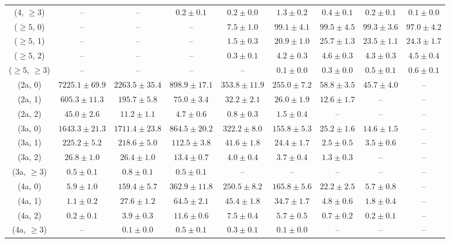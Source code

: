 \begin{table}[h!]
{\begin{tabular}{ccccccccc}
	(4, $\ge3$) & -- & -- & $0.2\pm 0.1$ & $0.2\pm 0.0$ & $1.3\pm 0.2$ & $0.4\pm 0.1$ & $0.2\pm 0.1$ & $0.1\pm 0.0$ \\[0.5ex] 
	($\ge5$, 0) & -- & -- & -- & $7.5\pm 1.0$ & $99.1\pm 4.1$ & $99.5\pm 4.5$ & $99.3\pm 3.6$ & $97.0\pm 4.2$ \\[0.5ex] 
	($\ge5$, 1) & -- & -- & -- & $1.5\pm 0.3$ & $20.9\pm 1.0$ & $25.7\pm 1.3$ & $23.5\pm 1.1$ & $24.3\pm 1.7$ \\[0.5ex] 
	($\ge5$, 2) & -- & -- & -- & $0.3\pm 0.1$ & $4.2\pm 0.3$ & $4.6\pm 0.3$ & $4.3\pm 0.3$ & $4.5\pm 0.4$ \\[0.5ex] 
	($\ge5$, $\ge3$) & -- & -- & -- & -- & $0.1\pm 0.0$ & $0.3\pm 0.0$ & $0.5\pm 0.1$ & $0.6\pm 0.1$ \\[0.5ex] 
	(2a, 0) & $7225.1\pm 69.9$ & $2263.5\pm 35.4$ & $898.9\pm 17.1$ & $353.8\pm 11.9$ & $255.0\pm 7.2$ & $58.8\pm 3.5$ & $45.7\pm 4.0$ & -- \\[0.5ex] 
	(2a, 1) & $605.3\pm 11.3$ & $195.7\pm 5.8$ & $75.0\pm 3.4$ & $32.2\pm 2.1$ & $26.0\pm 1.9$ & $12.6\pm 1.7$ & -- & -- \\[0.5ex] 
	(2a, 2) & $45.0\pm 2.6$ & $11.2\pm 1.1$ & $4.7\pm 0.6$ & $0.8\pm 0.3$ & $1.5\pm 0.4$ & -- & -- & -- \\[0.5ex] 
	(3a, 0) & $1643.3\pm 21.3$ & $1711.4\pm 23.8$ & $864.5\pm 20.2$ & $322.2\pm 8.0$ & $155.8\pm 5.3$ & $25.2\pm 1.6$ & $14.6\pm 1.5$ & -- \\[0.5ex] 
	(3a, 1) & $225.2\pm 5.2$ & $218.6\pm 5.0$ & $112.5\pm 3.8$ & $41.6\pm 1.8$ & $24.4\pm 1.7$ & $2.5\pm 0.5$ & $3.5\pm 0.6$ & -- \\[0.5ex] 
	(3a, 2) & $26.8\pm 1.0$ & $26.4\pm 1.0$ & $13.4\pm 0.7$ & $4.0\pm 0.4$ & $3.7\pm 0.4$ & $1.3\pm 0.3$ & -- & -- \\[0.5ex] 
	(3a, $\ge3$) & $0.5\pm 0.1$ & $0.8\pm 0.1$ & $0.5\pm 0.1$ & -- & -- & -- & -- & -- \\[0.5ex] 
	(4a, 0) & $5.9\pm 1.0$ & $159.4\pm 5.7$ & $362.9\pm 11.8$ & $250.5\pm 8.2$ & $165.8\pm 5.6$ & $22.2\pm 2.5$ & $5.7\pm 0.8$ & -- \\[0.5ex] 
	(4a, 1) & $1.1\pm 0.2$ & $27.6\pm 1.2$ & $64.5\pm 2.1$ & $45.4\pm 1.8$ & $34.7\pm 1.7$ & $4.8\pm 0.6$ & $1.8\pm 0.4$ & -- \\[0.5ex] 
	(4a, 2) & $0.2\pm 0.1$ & $3.9\pm 0.3$ & $11.6\pm 0.6$ & $7.5\pm 0.4$ & $5.7\pm 0.5$ & $0.7\pm 0.2$ & $0.2\pm 0.1$ & -- \\[0.5ex] 
	(4a, $\ge3$) & -- & $0.1\pm 0.0$ & $0.5\pm 0.1$ & $0.3\pm 0.1$ & $0.1\pm 0.0$ & -- & -- & -- \\[0.5ex] 

\end{tabular}}
\end{table}
